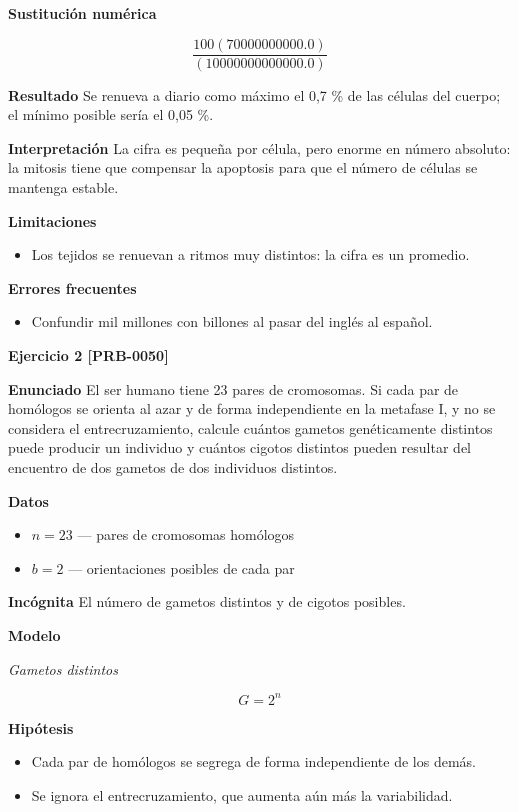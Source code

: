 \documentclass{book}
\begin{document}
\noindent\textbf{Sustitución numérica}

\[
\frac{100 \left(70000000000.0\right)}{\left(10000000000000.0\right)}
\]

\noindent\textbf{Resultado}
Se renueva a diario como máximo el 0,7 \% de las células del cuerpo; el mínimo posible sería el 0,05 \%.


\noindent\textbf{Interpretación}
La cifra es pequeña por célula, pero enorme en número absoluto: la mitosis tiene que compensar la apoptosis para que el número de células se mantenga estable.


\noindent\textbf{Limitaciones}
\begin{itemize}
\item Los tejidos se renuevan a ritmos muy distintos: la cifra es un promedio.
\end{itemize}

\noindent\textbf{Errores frecuentes}
\begin{itemize}
\item Confundir mil millones con billones al pasar del inglés al español.
\end{itemize}

\noindent\textbf{Ejercicio 2 [PRB-0050]}

\noindent\textbf{Enunciado}
El ser humano tiene 23 pares de cromosomas. Si cada par de homólogos se orienta al azar y de forma independiente en la metafase I, y no se considera el entrecruzamiento, calcule cuántos gametos genéticamente distintos puede producir un individuo y cuántos cigotos distintos pueden resultar del encuentro de dos gametos de dos individuos distintos.


\noindent\textbf{Datos}
\begin{itemize}
\item $n = 23$ — pares de cromosomas homólogos
\item $b = 2$ — orientaciones posibles de cada par
\end{itemize}

\noindent\textbf{Incógnita}
El número de gametos distintos y de cigotos posibles.


\noindent\textbf{Modelo}

\noindent\textit{Gametos distintos}

\[
G = 2^{n}
\]

\noindent\textbf{Hipótesis}
\begin{itemize}
\item Cada par de homólogos se segrega de forma independiente de los demás.
\item Se ignora el entrecruzamiento, que aumenta aún más la variabilidad.
\end{itemize}
\end{document}
